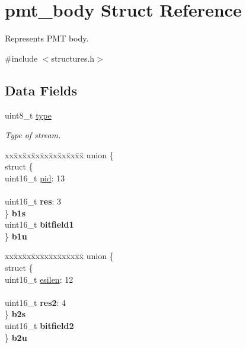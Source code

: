 \hypertarget{structpmt__body}{}\section{pmt\+\_\+body Struct Reference}
\label{structpmt__body}


Represents P\+MT body.  




{\ttfamily \#include $<$structures.\+h$>$}

\subsection*{Data Fields}
\begin{DoxyCompactItemize}
\item 
uint8\+\_\+t \hyperlink{structpmt__body_aeee07b891d89313dbe5c01b2d524bbfd}{type}\hypertarget{structpmt__body_aeee07b891d89313dbe5c01b2d524bbfd}{}\label{structpmt__body_aeee07b891d89313dbe5c01b2d524bbfd}

\begin{DoxyCompactList}\small\item\em Type of stream. \end{DoxyCompactList}\item 
\begin{tabbing}
xx\=xx\=xx\=xx\=xx\=xx\=xx\=xx\=xx\=\kill
union \{\\
\>struct \{\\
\>\>uint16\_t \hyperlink{structpmt__body_a2ef568b533b7dc10584970ee0cf79721}{pid}: 13\\
\>\>\\
\>\>uint16\_t {\bfseries res}: 3\\
\>\} {\bfseries b1s}\\
\>uint16\_t {\bfseries bitfield1}\\
\} {\bfseries b1u}\hypertarget{structpmt__body_a0119098b67b48f3f69728abb2f019dd8}{}\label{structpmt__body_a0119098b67b48f3f69728abb2f019dd8}
\\

\end{tabbing}\item 
\begin{tabbing}
xx\=xx\=xx\=xx\=xx\=xx\=xx\=xx\=xx\=\kill
union \{\\
\>struct \{\\
\>\>uint16\_t \hyperlink{structpmt__body_a1aed7248ad83715d38b55de7c9834bf6}{esilen}: 12\\
\>\>\\
\>\>uint16\_t {\bfseries res2}: 4\\
\>\} {\bfseries b2s}\\
\>uint16\_t {\bfseries bitfield2}\\
\} {\bfseries b2u}\hypertarget{structpmt__body_a1c7aac0682666c6af7df2622b5bcbb34}{}\label{structpmt__body_a1c7aac0682666c6af7df2622b5bcbb34}
\\

\end{tabbing}\end{DoxyCompactItemize}


